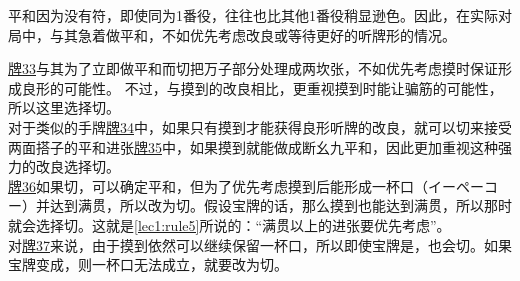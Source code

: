 平和因为没有符，即使同为1番役，往往也比其他1番役稍显逊色。因此，在实际对局中，与其急着做平和，不如优先考虑改良或等待更好的听牌形的情况。

\hyperref[lec6:pai33-37]{牌33}与其为了立即做平和而切把万子部分处理成两坎张，不如优先考虑摸时保证形成良形的可能性。
不过，与摸到的改良相比，更重视摸到时能让骗筋的可能性，所以这里选择切。\\
对于类似的手牌\hyperref[lec6:pai33-37]{牌34}中，如果只有摸到才能获得良形听牌的改良，就可以切来接受两面搭子的平和进张\hyperref[lec6:pai33-37]{牌35}中，如果摸到就能做成断幺九平和，因此更加重视这种强力的改良选择切。\\\hyperref[lec6:pai33-37]{牌36}如果切，可以确定平和，但为了优先考虑摸到后能形成一杯口（イーペーコー）并达到满贯，所以改为切。假设宝牌的话，那么摸到也能达到满贯，所以那时就会选择切。这就是\ref{lec1:rule5}所说的：“满贯以上的进张要优先考虑”。\\
对\hyperref[lec6:pai33-37]{牌37}来说，由于摸到依然可以继续保留一杯口，所以即使宝牌是，也会切。如果宝牌变成，则一杯口无法成立，就要改为切。

